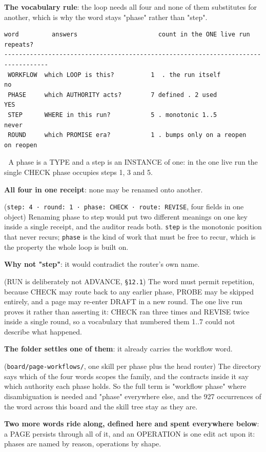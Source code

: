 \textbf{The vocabulary rule}: the loop needs all four and none of them substitutes for another, which is why the word stays "phase" rather than "step".

\begin{verbatim}
word         answers                      count in the ONE live run    repeats?
----------------------------------------------------------------------------------
 WORKFLOW  which LOOP is this?          1  . the run itself          no
 PHASE     which AUTHORITY acts?        7 defined . 2 used           YES
 STEP      WHERE in this run?           5 . monotonic 1..5           never
 ROUND     which PROMISE era?           1 . bumps only on a reopen   on reopen
\end{verbatim}
📌 A phase is a TYPE and a step is an INSTANCE of one: in the one live run the single CHECK phase occupies steps 1, 3 and 5.

\textbf{All four in one receipt}: none may be renamed onto another.

(\texttt{step: 4 · round: 1 · phase: CHECK · route: REVISE}, four fields in one object) Renaming phase to step would put two different meanings on one key inside a single receipt, and the auditor reads both. \texttt{step} is the monotonic position that never recurs; \texttt{phase} is the kind of work that must be free to recur, which is the property the whole loop is built on.

\textbf{Why not "step"}: it would contradict the router's own name.

(RUN is deliberately not ADVANCE, \texttt{§12.1}) The word must permit repetition, because CHECK may route back to any earlier phase, PROBE may be skipped entirely, and a page may re-enter DRAFT in a new round. The one live run proves it rather than asserting it: CHECK ran three times and REVISE twice inside a single round, so a vocabulary that numbered them 1..7 could not describe what happened.

\textbf{The folder settles one of them}: it already carries the workflow word.

(\texttt{board/page-workflows/}, one skill per phase plus the head router) The directory says which of the four words scopes the family, and the contracts inside it say which authority each phase holds. So the full term is "workflow phase" where disambiguation is needed and "phase" everywhere else, and the 927 occurrences of the word across this board and the skill tree stay as they are.

\textbf{Two more words ride along, defined here and spent everywhere below}: a PAGE persists through all of it, and an OPERATION is one edit act upon it: phases are named by reason, operations by shape.

